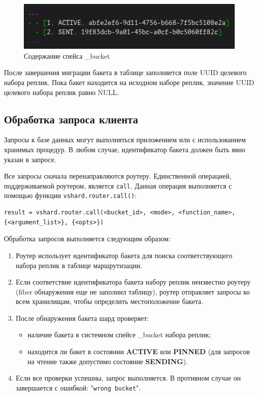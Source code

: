 \begin{figure}
  \centering
  \includegraphics[scale=0.35]{inc/bucket-space.png}
  \caption{Содержание спейса _bucket}
  \label{fig:fig07}
\end{figure}

После завершения миграции бакета в таблице заполняется поле UUID целевого
набора реплик. Пока бакет находится на исходном наборе реплик, значение UUID
целевого набора реплик равно NULL.

\subsection{Обработка запроса клиента}

Запросы к базе данных могут выполняться приложением или с использованием
хранимых процедур. В любом случае, идентификатор бакета должен быть явно указан
в запросе.

Все запросы сначала перенаправляются роутеру. Единственной операцией,
поддерживаемой роутером, является \texttt{call}. Данная операция выполняется с
помощью функции \texttt{vshard.router.call()}:

\begin{verbatim}
result = vshard.router.call(<bucket_id>, <mode>, <function_name>, {<argument_list>}, {<opts>})
\end{verbatim}

Обработка запросов выполняется следующим образом:

\begin{enumerate}
\item Роутер использует идентификатор бакета для поиска соответствующего набора
    реплик в таблице маршрутизации.
\item Если соответствие идентификатора бакета набору реплик неизвестно роутеру
    (fiber обнаружения еще не заполнил таблицу), роутер отправляет запросы ко
    всем хранилищам, чтобы определить местоположение бакета.
\item После обнаружения бакета шард проверяет:
\begin{itemize}
    \item наличие бакета в системном спейсе \_bucket набора реплик;
    \item находится ли бакет в состоянии \textbf{ACTIVE} или \textbf{PINNED}
        (для запросов на чтение также допустимо состояние \textbf{SENDING}).
\end{itemize}
\item Если все проверки успешны, запрос выполняется. В противном случае он
    завершается с ошибкой: "\texttt{wrong bucket}".
\end{enumerate}
